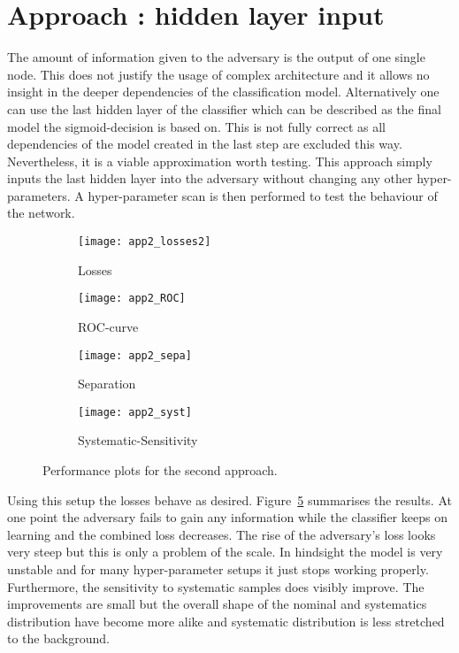 \section{Approach : hidden layer input}

The amount of information given to the adversary is the output of one single node. This does not justify the usage of complex architecture and it allows no insight in the deeper dependencies of the classification model. Alternatively one can use the last hidden layer of the classifier which can be described as the final model the sigmoid-decision is based on. This is not fully correct as all dependencies of the model created in the last step are excluded this way. Nevertheless, it is a viable approximation worth testing.
This approach simply inputs the last hidden layer into the adversary without changing any other hyper-parameters. A hyper-parameter scan is then performed to test the behaviour of the network.
%
\begin{figure}[htbp]
    \centering
    \begin{subfigure}[b]{0.45\textwidth}
        \texttt{[image: app2\_losses2]}
        \caption{Losses}
        \label{fig:app2:losses}
    \end{subfigure}
\quad
    \begin{subfigure}[b]{0.45\textwidth}
        \texttt{[image: app2\_ROC]}
        \caption{ROC-curve}
        \label{fig:app2:ROC}
    \end{subfigure}

    \begin{subfigure}[b]{0.45\textwidth}
		\texttt{[image: app2\_sepa]}
		\caption{Separation}
		\label{fig:app2:sepa}
	\end{subfigure}
\quad
	\begin{subfigure}[b]{0.45\textwidth}
		\texttt{[image: app2\_syst]}
		\caption{Systematic-Sensitivity}
		\label{fig:app2:syst}
	\end{subfigure}
    \caption{Performance plots for the second approach.}
	\label{fig:app2}
\end{figure}
%
%
Using this setup the losses behave as desired. Figure~\ref{fig:app2} summarises the results. At one point the adversary fails to gain any information while the classifier keeps on learning and the combined loss decreases. The rise of the adversary's loss looks very steep but this is only a problem of the scale. In hindsight the model is very unstable and for many hyper-parameter setups it just stops working properly. Furthermore, the sensitivity to systematic samples does visibly improve. The improvements are small but the overall shape of the nominal and systematics distribution have become more alike and systematic distribution is less stretched to the background.
